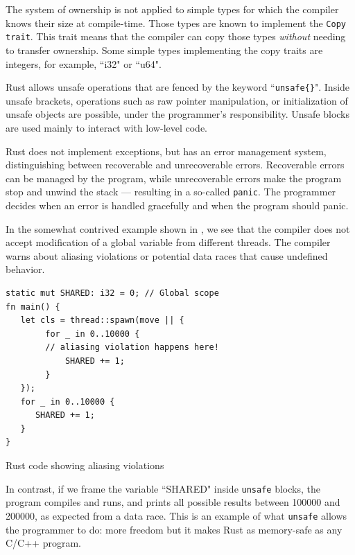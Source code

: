 \documentclass[nomenclature, english, bibtex]{kththesis}
\begin{document}
The system of ownership is not applied to simple types for which the compiler knows their size at compile-time. Those types are known to implement the \texttt{Copy trait}. This trait means that the compiler can copy those types \emph{without} needing to transfer ownership. Some simple types implementing the copy traits are integers, for example, ``i32" or ``u64".

Rust allows unsafe operations that are fenced by the keyword ``\texttt{unsafe\{\}}". Inside unsafe brackets, operations such as raw pointer manipulation, or initialization of unsafe objects are possible, under the programmer's responsibility. Unsafe blocks are used mainly to interact with low-level code.

Rust does not implement exceptions, but has an error management system, distinguishing between recoverable and unrecoverable errors. Recoverable errors can be managed by the program, while unrecoverable errors make the program stop and unwind the stack --- resulting in a so-called \texttt{panic}. The programmer decides when an error is handled gracefully and when the program should panic.

In the somewhat contrived  example shown in , we see that the compiler does not accept modification of a global variable from different threads. The compiler warns about aliasing violations or potential data races that cause undefined behavior.
\begin{listing}[!ht]
\begin{verbatim}
static mut SHARED: i32 = 0; // Global scope
fn main() {
   let cls = thread::spawn(move || {
        for _ in 0..10000 {
        // aliasing violation happens here!
            SHARED += 1;
        }
   });
   for _ in 0..10000 {
      SHARED += 1;
   }
}
\end{verbatim}
\caption[Rust code showing aliasing violations]{Rust code showing aliasing violations}
\label{lstlisting:data_race}
\end{listing}
\FloatBarrier

In contrast, if we frame the variable ``SHARED" inside \texttt{unsafe} blocks, the program compiles and runs, and prints all possible results between 100000 and 200000, as expected from a data race. This is an example of what \texttt{unsafe} allows the programmer to do: more freedom but it makes Rust as memory-safe as any C/C++ program.
\end{document}
